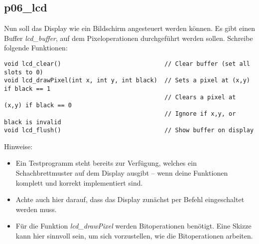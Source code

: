 \subsection{p06\_lcd}
Nun soll das Display wie ein Bildschirm angesteuert werden können. Es gibt einen Buffer \textit{lcd\_buffer}, auf dem Pixeloperationen durchgeführt werden sollen. 
Schreibe folgende Funktionen:
\begin{lstlisting}
void lcd_clear()                             // Clear buffer (set all slots to 0)
void lcd_drawPixel(int x, int y, int black)  // Sets a pixel at (x,y) if black == 1
                                             // Clears a pixel at (x,y) if black == 0
                                             // Ignore if x,y, or black is invalid
void lcd_flush()                             // Show buffer on display
\end{lstlisting}
Hinweise:
\begin{itemize}
\item 
Ein Testprogramm steht bereits zur Verfügung, welches ein Schachbrettmuster auf dem Display ausgibt -- wenn deine Funktionen komplett und korrekt implementiert sind.

\item
Achte auch hier darauf, dass das Display zunächst per Befehl eingeschaltet werden muss.

\item
Für die Funktion \textit{lcd\_drawPixel} werden Bitoperationen benötigt. Eine Skizze kann hier sinnvoll sein, um sich vorzustellen, wie die Bitoperationen arbeiten.
\end{itemize}



